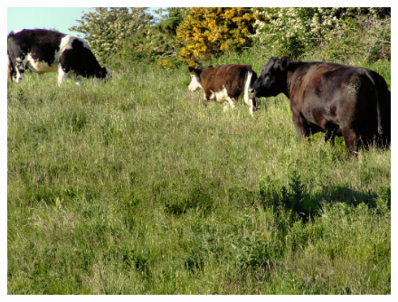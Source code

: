 \documentclass[a4paper, 10pt]{article}
\begin{document}
\begin{figure}[H]
\begin{minipage}{.4\textwidth}
\includegraphics[scale=0.25]{inpainted/perfect-cow.png}
\end{minipage}%
\end{figure}
\end{document}
